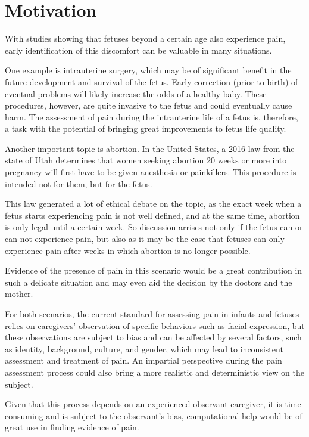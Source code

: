 \documentclass[msc]{ppgccufmg}
\begin{document}
\section{Motivation}

With studies showing that fetuses beyond a certain age also experience pain, early identification of this discomfort can be valuable in many situations.

One example is intrauterine surgery, which may be of significant benefit in the future development and survival of the fetus. Early correction (prior to birth) of eventual problems will likely increase the odds of a healthy baby. These procedures, however, are quite invasive to the fetus and could eventually cause harm. The assessment of pain during the intrauterine life of a fetus is, therefore, a task with the potential of bringing great improvements to fetus life quality. 

Another important topic is abortion. In the United States, a 2016 law from the state of Utah determines that women seeking abortion 20 weeks or more into pregnancy will first have to be given anesthesia or painkillers. This procedure is intended not for them, but for the fetus. 

This law generated a lot of ethical debate on the topic, as the exact week when a fetus starts experiencing pain is not well defined, and at the same time, abortion is only legal until a certain week. So discussion arrises not only if the fetus can or can not experience pain, but also as it may be the case that fetuses can only experience pain after weeks in which abortion is no longer possible.

Evidence of the presence of pain in this scenario would be a great contribution in such a delicate situation and may even aid the decision by the doctors and the mother.

For both scenarios, the current standard for assessing pain in infants and fetuses relies on caregivers’ observation of specific behaviors such as facial expression, but these observations are subject to bias and can be affected by several factors, such as identity, background, culture, and gender, which may lead to inconsistent assessment and treatment of pain. An impartial perspective during the pain assessment process could also bring a more realistic and deterministic view on the subject.

Given that this process depends on an experienced observant caregiver, it is time-consuming and is subject to the observant's bias, computational help would be of great use in finding evidence of pain.
\end{document}
